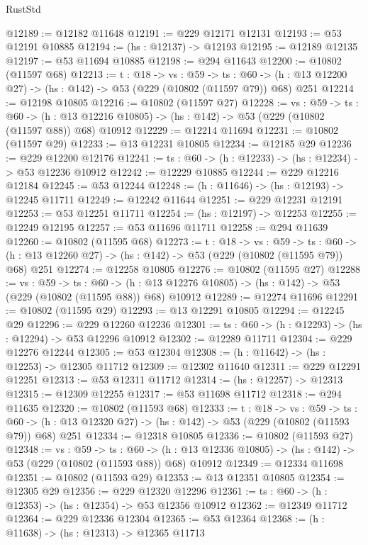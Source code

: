 \begin{lexlean}{RustStd}
\begin{coremodule}
@12189 := @12182 @11648
@12191 := @229 @12171 @12131
@12193 := @53 @12191 @10885
@12194 := (hs : @12137) -> @12193
@12195 := @12189 @12135
@12197 := @53 @11694 @10885
@12198 := @294 @11643
@12200 := @10802 (@11597 @68)
@12213 := {t : @18} ->
  {vs : @59} ->
  {ts : @60} -> (h : @13 @12200 @27) -> (hs : @142) -> @53 (@229 (@10802 (@11597 @79)) @68) @251
@12214 := @12198 @10805
@12216 := @10802 (@11597 @27)
@12228 := {vs : @59} ->
  {ts : @60} ->
  (h : @13 @12216 @10805) -> (hs : @142) -> @53 (@229 (@10802 (@11597 @88)) @68) @10912
@12229 := @12214 @11694
@12231 := @10802 (@11597 @29)
@12233 := @13 @12231 @10805
@12234 := @12185 @29
@12236 := @229 @12200 @12176
@12241 := {ts : @60} -> (h : @12233) -> (hs : @12234) -> @53 @12236 @10912
@12242 := @12229 @10885
@12244 := @229 @12216 @12184
@12245 := @53 @12244
@12248 := (h : @11646) -> (hs : @12193) -> @12245 @11711
@12249 := @12242 @11644
@12251 := @229 @12231 @12191
@12253 := @53 @12251 @11711
@12254 := (hs : @12197) -> @12253
@12255 := @12249 @12195
@12257 := @53 @11696 @11711
@12258 := @294 @11639
@12260 := @10802 (@11595 @68)
@12273 := {t : @18} ->
  {vs : @59} ->
  {ts : @60} -> (h : @13 @12260 @27) -> (hs : @142) -> @53 (@229 (@10802 (@11595 @79)) @68) @251
@12274 := @12258 @10805
@12276 := @10802 (@11595 @27)
@12288 := {vs : @59} ->
  {ts : @60} ->
  (h : @13 @12276 @10805) -> (hs : @142) -> @53 (@229 (@10802 (@11595 @88)) @68) @10912
@12289 := @12274 @11696
@12291 := @10802 (@11595 @29)
@12293 := @13 @12291 @10805
@12294 := @12245 @29
@12296 := @229 @12260 @12236
@12301 := {ts : @60} -> (h : @12293) -> (hs : @12294) -> @53 @12296 @10912
@12302 := @12289 @11711
@12304 := @229 @12276 @12244
@12305 := @53 @12304
@12308 := (h : @11642) -> (hs : @12253) -> @12305 @11712
@12309 := @12302 @11640
@12311 := @229 @12291 @12251
@12313 := @53 @12311 @11712
@12314 := (hs : @12257) -> @12313
@12315 := @12309 @12255
@12317 := @53 @11698 @11712
@12318 := @294 @11635
@12320 := @10802 (@11593 @68)
@12333 := {t : @18} ->
  {vs : @59} ->
  {ts : @60} -> (h : @13 @12320 @27) -> (hs : @142) -> @53 (@229 (@10802 (@11593 @79)) @68) @251
@12334 := @12318 @10805
@12336 := @10802 (@11593 @27)
@12348 := {vs : @59} ->
  {ts : @60} ->
  (h : @13 @12336 @10805) -> (hs : @142) -> @53 (@229 (@10802 (@11593 @88)) @68) @10912
@12349 := @12334 @11698
@12351 := @10802 (@11593 @29)
@12353 := @13 @12351 @10805
@12354 := @12305 @29
@12356 := @229 @12320 @12296
@12361 := {ts : @60} -> (h : @12353) -> (hs : @12354) -> @53 @12356 @10912
@12362 := @12349 @11712
@12364 := @229 @12336 @12304
@12365 := @53 @12364
@12368 := (h : @11638) -> (hs : @12313) -> @12365 @11713

\end{coremodule}
\end{lexlean}
